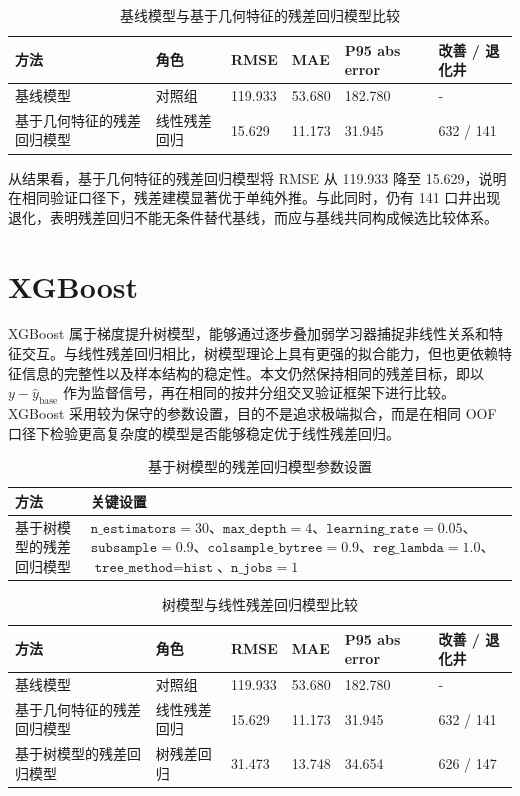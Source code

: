 \documentclass[openany]{Template_ECNU_Undergraduate_202505/ecnuundergraduate}
\begin{document}
\begin{table}[H]
\centering
\small
\begin{tabular}{@{}p{4.5cm}p{2.2cm}p{1.6cm}p{1.6cm}p{1.8cm}p{1.8cm}@{}}
\toprule
方法 & 角色 & RMSE & MAE & P95 abs error & 改善 / 退化井 \\
\midrule
基线模型 & 对照组 & 119.933 & 53.680 & 182.780 & - \\
基于几何特征的残差回归模型 & 线性残差回归 & 15.629 & 11.173 & 31.945 & 632 / 141 \\
\bottomrule
\end{tabular}
\caption{基线模型与基于几何特征的残差回归模型比较}
\end{table}

从结果看，基于几何特征的残差回归模型将 RMSE 从 119.933 降至 15.629，说明在相同验证口径下，残差建模显著优于单纯外推。与此同时，仍有 141 口井出现退化，表明残差回归不能无条件替代基线，而应与基线共同构成候选比较体系。

\section{XGBoost}
XGBoost 属于梯度提升树模型，能够通过逐步叠加弱学习器捕捉非线性关系和特征交互。与线性残差回归相比，树模型理论上具有更强的拟合能力，但也更依赖特征信息的完整性以及样本结构的稳定性。本文仍然保持相同的残差目标，即以 \(y-\hat y_{\mathrm{base}}\) 作为监督信号，再在相同的按井分组交叉验证框架下进行比较。
XGBoost 采用较为保守的参数设置，目的不是追求极端拟合，而是在相同 OOF 口径下检验更高复杂度的模型是否能够稳定优于线性残差回归。

\begin{table}[H]
\centering
\small
\begin{tabular}{@{}p{4.0cm}p{10.5cm}@{}}
\toprule
方法 & 关键设置 \\
\midrule
基于树模型的残差回归模型 & \(\texttt{n\_estimators}=30\)、\(\texttt{max\_depth}=4\)、\(\texttt{learning\_rate}=0.05\)、\(\texttt{subsample}=0.9\)、\(\texttt{colsample\_bytree}=0.9\)、\(\texttt{reg\_lambda}=1.0\)、\(\texttt{tree\_method}=\texttt{hist}\)、\(\texttt{n\_jobs}=1\) \\
\bottomrule
\end{tabular}
\caption{基于树模型的残差回归模型参数设置}
\end{table}

\begin{table}[H]
\centering
\small
\begin{tabular}{@{}p{4.5cm}p{2.2cm}p{1.6cm}p{1.6cm}p{1.8cm}p{1.8cm}@{}}
\toprule
方法 & 角色 & RMSE & MAE & P95 abs error & 改善 / 退化井 \\
\midrule
基线模型 & 对照组 & 119.933 & 53.680 & 182.780 & - \\
基于几何特征的残差回归模型 & 线性残差回归 & 15.629 & 11.173 & 31.945 & 632 / 141 \\
基于树模型的残差回归模型 & 树残差回归 & 31.473 & 13.748 & 34.654 & 626 / 147 \\
\bottomrule
\end{tabular}
\caption{树模型与线性残差回归模型比较}
\end{table}
\end{document}
